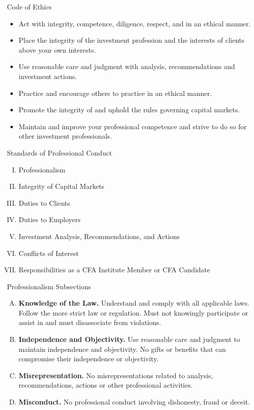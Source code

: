 \documentclass[../custom,grid]{flashcards}
\begin{document}

\begin{flashcard}{Code of Ethics}
    \begin{itemize}
        \item Act with integrity, competence, diligence, respect, and in an ethical manner.
        \item Place the integrity of the investment profession and the interests of clients above your own interests.
        \item Use reasonable care and judgment with analysis, recommendations and investment actions.
        \item Practice and encourage others to practice in an ethical manner.
        \item Promote the integrity of and uphold the rules governing capital markets.
        \item Maintain and improve your professional competence and strive to do so for other investment professionals.
    \end{itemize}
\end{flashcard}

\begin{flashcard}{Standards of Professional Conduct}
    \begin{enumerate}[I.]
        \item Professionalism
        \item Integrity of Capital Markets
        \item Duties to Clients
        \item Duties to Employers
        \item Investment Analysis, Recommendations, and Actions
        \item Conflicts of Interest
        \item Responsibilities as a CFA Institute Member or CFA Candidate
    \end{enumerate}
\end{flashcard}

\begin{flashcard}{Professionalism Subsections}
    \begin{enumerate}[A.]
        \item \textbf{Knowledge of the Law.} Understand and comply with all applicable laws. Follow the more strict law or regulation. Must not knowingly participate or assist in and must disassociate from violations.
        \item \textbf{Independence and Objectivity.} Use reasonable care and judgment to maintain independence and objectivity. No gifts or benefits that can compromise their independence or objectivity.
        \item \textbf{Misrepresentation.} No misrepresentations related to analysis, recommendations, actions or other professional activities.
        \item \textbf{Misconduct.} No professional conduct involving dishonesty, fraud or deceit.
    \end{enumerate}
\end{flashcard}
\end{document}
